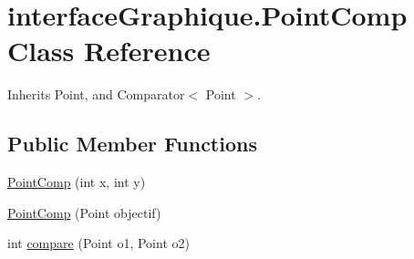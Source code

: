 \hypertarget{classinterface_graphique_1_1_point_comp}{\section{interface\-Graphique.\-Point\-Comp Class Reference}
\label{classinterface_graphique_1_1_point_comp}
}


Inherits Point, and Comparator$<$ Point $>$.

\subsection*{Public Member Functions}
\begin{DoxyCompactItemize}
\item 
\hyperlink{classinterface_graphique_1_1_point_comp_a445b387040f356ab15230221389ecddf}{Point\-Comp} (int x, int y)
\item 
\hyperlink{classinterface_graphique_1_1_point_comp_af60c856a56ce03b321d589f5d691ba8c}{Point\-Comp} (Point objectif)
\item 
int \hyperlink{classinterface_graphique_1_1_point_comp_aaaa8644250b70b34ee1a86da23e14a3a}{compare} (Point o1, Point o2)
\end{DoxyCompactItemize}


